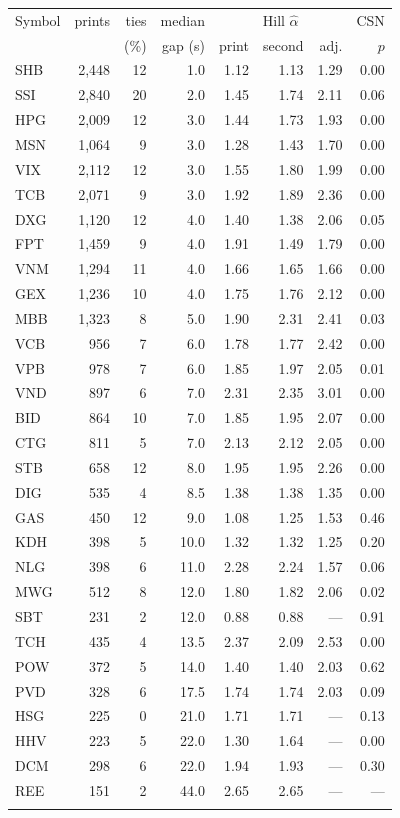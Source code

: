 \begin{tabular}{@{}lrrrrrrr@{}}
\toprule
Symbol & prints & ties & median & \multicolumn{3}{c}{Hill $\hat\alpha$} & CSN \\
 & & (\%) & gap (s) & print & second & adj. & $p$ \\
\colrule
SHB & 2{,}448 & 12 & 1.0 & 1.12 & 1.13 & 1.29 & 0.00 \\
SSI & 2{,}840 & 20 & 2.0 & 1.45 & 1.74 & 2.11 & 0.06 \\
HPG & 2{,}009 & 12 & 3.0 & 1.44 & 1.73 & 1.93 & 0.00 \\
MSN & 1{,}064 & 9 & 3.0 & 1.28 & 1.43 & 1.70 & 0.00 \\
VIX & 2{,}112 & 12 & 3.0 & 1.55 & 1.80 & 1.99 & 0.00 \\
TCB & 2{,}071 & 9 & 3.0 & 1.92 & 1.89 & 2.36 & 0.00 \\
DXG & 1{,}120 & 12 & 4.0 & 1.40 & 1.38 & 2.06 & 0.05 \\
FPT & 1{,}459 & 9 & 4.0 & 1.91 & 1.49 & 1.79 & 0.00 \\
VNM & 1{,}294 & 11 & 4.0 & 1.66 & 1.65 & 1.66 & 0.00 \\
GEX & 1{,}236 & 10 & 4.0 & 1.75 & 1.76 & 2.12 & 0.00 \\
MBB & 1{,}323 & 8 & 5.0 & 1.90 & 2.31 & 2.41 & 0.03 \\
VCB & 956 & 7 & 6.0 & 1.78 & 1.77 & 2.42 & 0.00 \\
VPB & 978 & 7 & 6.0 & 1.85 & 1.97 & 2.05 & 0.01 \\
VND & 897 & 6 & 7.0 & 2.31 & 2.35 & 3.01 & 0.00 \\
BID & 864 & 10 & 7.0 & 1.85 & 1.95 & 2.07 & 0.00 \\
CTG & 811 & 5 & 7.0 & 2.13 & 2.12 & 2.05 & 0.00 \\
STB & 658 & 12 & 8.0 & 1.95 & 1.95 & 2.26 & 0.00 \\
DIG & 535 & 4 & 8.5 & 1.38 & 1.38 & 1.35 & 0.00 \\
GAS & 450 & 12 & 9.0 & 1.08 & 1.25 & 1.53 & 0.46 \\
KDH & 398 & 5 & 10.0 & 1.32 & 1.32 & 1.25 & 0.20 \\
NLG & 398 & 6 & 11.0 & 2.28 & 2.24 & 1.57 & 0.06 \\
MWG & 512 & 8 & 12.0 & 1.80 & 1.82 & 2.06 & 0.02 \\
SBT & 231 & 2 & 12.0 & 0.88 & 0.88 & --- & 0.91 \\
TCH & 435 & 4 & 13.5 & 2.37 & 2.09 & 2.53 & 0.00 \\
POW & 372 & 5 & 14.0 & 1.40 & 1.40 & 2.03 & 0.62 \\
PVD & 328 & 6 & 17.5 & 1.74 & 1.74 & 2.03 & 0.09 \\
HSG & 225 & 0 & 21.0 & 1.71 & 1.71 & --- & 0.13 \\
HHV & 223 & 5 & 22.0 & 1.30 & 1.64 & --- & 0.00 \\
DCM & 298 & 6 & 22.0 & 1.94 & 1.93 & --- & 0.30 \\
REE & 151 & 2 & 44.0 & 2.65 & 2.65 & --- & --- \\
\botrule
\end{tabular}